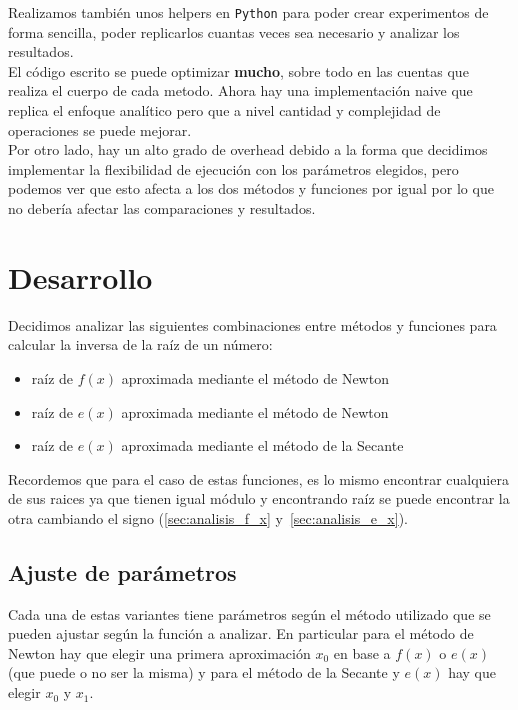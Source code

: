 Realizamos también unos helpers en \verb|Python| para poder crear experimentos
de forma sencilla, poder replicarlos cuantas veces sea necesario y analizar
los resultados.\\

El código escrito se puede optimizar \textbf{mucho}, sobre todo en las cuentas
que realiza el cuerpo de cada metodo. Ahora hay una implementación naive que
replica el enfoque analítico pero que a nivel cantidad y complejidad de
operaciones se puede mejorar.\\

Por otro lado, hay un alto grado de overhead debido a la forma que decidimos
implementar la flexibilidad de ejecución con los parámetros elegidos, pero
podemos ver que esto afecta a los dos métodos y funciones por igual por lo que
no debería afectar las comparaciones y resultados.

\newpage
\section{Desarrollo}

Decidimos analizar las siguientes combinaciones entre métodos y funciones para
calcular la inversa de la raíz de un número:

\begin{itemize}
    \item raíz de $f(x)$ aproximada mediante el método de Newton
    \item raíz de $e(x)$ aproximada mediante el método de Newton
    \item raíz de $e(x)$ aproximada mediante el método de la Secante
\end{itemize}

Recordemos que para el caso de estas funciones, es lo mismo encontrar
cualquiera de sus raices ya que tienen igual módulo y encontrando raíz se puede
encontrar la otra cambiando el signo (\ref{sec:analisis_f_x}
y~\ref{sec:analisis_e_x}).

\subsection{Ajuste de parámetros}

Cada una de estas variantes tiene parámetros según el método utilizado que se
pueden ajustar según la función a analizar. En particular para el método de
Newton hay que elegir una primera aproximación $x_0$ en base a $f(x)$ o $e(x)$
(que puede o no ser la misma) y para el método de la Secante y $e(x)$ hay que
elegir $x_0$ y $x_1$.\\


